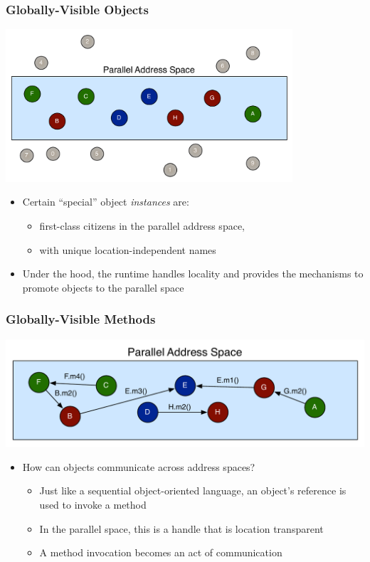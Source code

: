 \begin{frame}[fragile]
  \frametitle{Globally-Visible Objects}
  \begin{center}
    \includegraphics[width=0.8\textwidth]{figures/objectGlobalAddress.pdf}
  \end{center}
  \begin{itemize}
    \item Certain ``special'' object \emph{instances} are:
      \begin{itemize}
      \item first-class citizens in the parallel address space,
      \item with unique location-independent names
      \end{itemize}
    \item Under the hood, the runtime handles locality and provides the
      mechanisms to promote objects to the parallel space
  \end{itemize}
\end{frame}

\begin{frame}[fragile]
  \frametitle{Globally-Visible Methods}
  \begin{center}
    \includegraphics[width=\textwidth]{figures/objectMethodGlobalAddress.pdf}
  \end{center}
  \begin{itemize}
    \item How can objects communicate across address spaces?
      \begin{itemize}
      \item Just like a sequential object-oriented language, an object's
        reference is used to invoke a method
      \item In the parallel space, this is a handle that is location
          transparent
      \item A method invocation becomes an act of communication
      \end{itemize}
  \end{itemize}
\end{frame}

